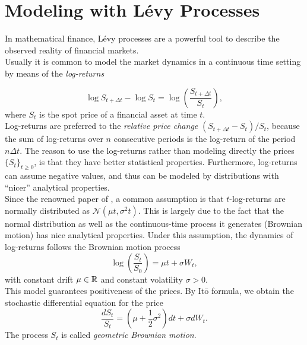 

\chapter{Modeling with Lévy Processes}\label{Chapter1}
\minitoc%


\vspace{5em}

In mathematical finance, Lévy processes are a powerful tool to describe the observed reality of financial markets.\\ 
Usually it is common to model the market dynamics in a continuous time setting by means of the \emph{log-returns}

\begin{equation}
 \log S_{t+\Delta t} - \log S_t = \log \left(\frac{S_{t+\Delta t}}{S_t}\right),
\end{equation}
where $S_t$ is the spot price of a financial asset at time $t$.\\
Log-returns are preferred to the \emph{relative price change} $(S_{t+\Delta t} - S_t )/S_t$, because the sum of log-returns 
over $n$ consecutive periods is the log-return of the period $n \Delta t$.
The reason to use the log-returns rather than modeling directly the prices $\{S_t\}_{t \geq0}$, is that they have better statistical properties.
Furthermore, log-returns can assume negative values, and thus can be modeled by distributions
with ``nicer'' analytical properties.\\
Since the renowned paper of \cite{BS73}, a common assumption is that $t$-log-returns are 
normally distributed as $\mathcal{N}(\mu t,\sigma^2 t)$. 
This is largely due to the fact that the normal distribution as well as the continuous-time process
it generates (Brownian motion) has nice analytical properties.
Under this assumption, the dynamics  of log-returns follows the Brownian motion process
\begin{equation}\label{GBM}
 \log \left( \frac{S_t}{S_0} \right) = \mu t + \sigma W_t ,
\end{equation}
with constant drift $\mu \in \mathbb{R}$ and constant volatility $\sigma >0$.\\
This model guarantees positiveness of the prices. By It\={o} formula, we obtain the stochastic differential equation for the price
\begin{equation}\label{GBM_sde}
 \frac{d S_t}{S_t} = (\mu + \frac{1}{2} \sigma^2) d t + \sigma dW_t  .
\end{equation}
The process $S_t$ is called \emph{geometric Brownian motion}.\\
